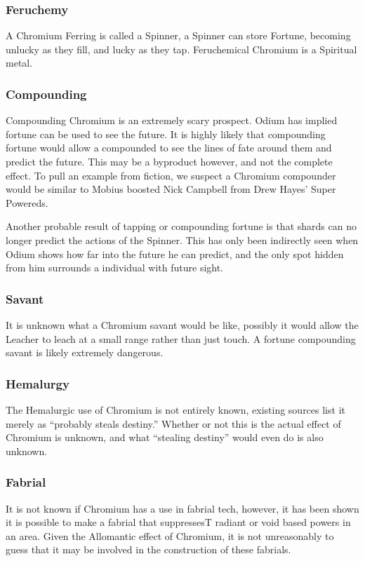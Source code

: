 \documentclass[conference]{IEEEtran}
\newcommand{\n}{\hfill\break}
\begin{document}
\subsubsection*{\textbf{Feruchemy}}
A Chromium Ferring is called a Spinner,\cite{ARS} a Spinner can store Fortune, becoming unlucky as they fill, and lucky as they tap.\cite{ARS}  Feruchemical Chromium is a Spiritual metal.\cite{FE-TB}\\
\subsubsection*{\textbf{Compounding}}
Compounding Chromium is an extremely scary prospect.  Odium has implied fortune can be used to see the future.\cite{OB-CH122}  It is highly likely that compounding fortune would allow a compounded to see the lines of fate around them and predict the future.\cite{atium-forutne}  This may be a byproduct however, and not the complete effect.  To pull an example from fiction, we suspect a Chromium compounder would be similar to Mobius boosted Nick Campbell from Drew Hayes' Super Powereds.\cite{nick-cambll}

Another probable result of tapping or compounding fortune is that shards can no longer predict the actions of the Spinner.  This has only been indirectly seen when Odium shows how far into the future he can predict, and the only spot hidden from him surrounds a individual with future sight.\cite{RoW-I6}\\
\subsubsection*{\textbf{Savant}}
It is unknown what a Chromium savant would be like, possibly it would allow the Leacher to leach at a small range rather than just touch. A fortune compounding savant is likely extremely dangerous.\\
\subsubsection*{\textbf{Hemalurgy}}
The Hemalurgic use of Chromium is not entirely known, existing sources list it merely as ``probably steals destiny.''\cite{HE-TB}  Whether or not this is the actual effect of Chromium is unknown, and what ``stealing destiny'' would even do is also unknown.  \\
\subsubsection*{\textbf{Fabrial}}
It is not known if Chromium has a use in fabrial tech, however, it has been shown it is possible to make a fabrial that suppressesT radiant\cite{RoW-CH9} or void\cite{RoW-CH39} based powers in an area.  Given the Allomantic effect of Chromium, it is not unreasonably to guess that it may be involved in the construction of these fabrials.
\n
\end{document}
